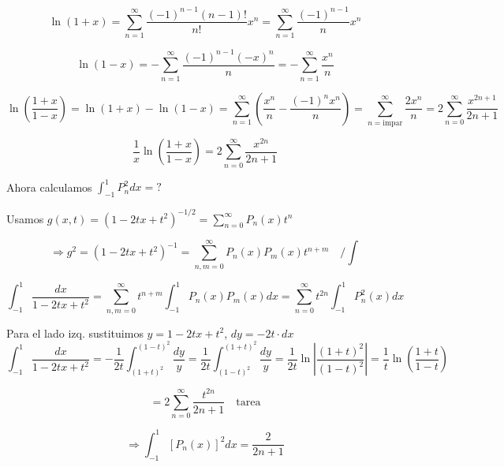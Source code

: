 \begin{equation}
    \ln(1+x) = \sum_{n=1}^{\infty} \frac{(-1)^{n-1}(n-1)!}{n!} x^n = \sum_{n=1}^{\infty} \frac{(-1)^{n-1}}{n} x^n
\end{equation}

\begin{equation}
    \ln(1-x) = -\sum_{n=1}^{\infty} \frac{(-1)^{n-1}(-x)^n}{n} = -\sum_{n=1}^{\infty} \frac{x^n}{n}
\end{equation}

\begin{equation}
    \ln(\frac{1+x}{1-x}) = \ln(1+x) - \ln(1-x) = \sum_{n=1}^{\infty} (\frac{x^n}{n} - \frac{(-1)^n x^n}{n}) = \sum_{n=\text{impar}}^{\infty} \frac{2 x^n}{n} = 2 \sum_{n=0}^{\infty} \frac{x^{2n+1}}{2n+1}
\end{equation}

\begin{equation}
    \frac{1}{x} \ln(\frac{1+x}{1-x}) = 2 \sum_{n=0}^{\infty} \frac{x^{2n}}{2n+1}
\end{equation}


Ahora calculamos $\int_{-1}^{1} P_n^2 dx = ?$

Usamos $g(x,t) = (1-2tx+t^2)^{-1/2} = \sum_{n=0}^{\infty} P_n(x) t^n$

\begin{equation}
    \Rightarrow g^2 = (1-2tx+t^2)^{-1} = \sum_{n,m=0}^{\infty} P_n(x) P_m(x) t^{n+m} \quad / \int
\end{equation}

\begin{equation}
    \int_{-1}^{1} \frac{dx}{1-2tx+t^2} = \sum_{n,m=0}^{\infty} t^{n+m} \int_{-1}^{1} P_n(x) P_m(x) dx = \sum_{n=0}^{\infty} t^{2n} \int_{-1}^{1} P_n^2(x) dx
\end{equation}

Para el lado izq. sustituimos $y = 1-2tx+t^2$, $dy = -2t \cdot dx$
\begin{equation}
    \int_{-1}^{1} \frac{dx}{1-2tx+t^2} = -\frac{1}{2t} \int_{(1+t)^2}^{(1-t)^2} \frac{dy}{y} = \frac{1}{2t} \int_{(1-t)^2}^{(1+t)^2} \frac{dy}{y} = \frac{1}{2t} \ln \left| \frac{(1+t)^2}{(1-t)^2} \right| = \frac{1}{t} \ln(\frac{1+t}{1-t})
\end{equation}

\begin{equation}
    = 2 \sum_{n=0}^{\infty} \frac{t^{2n}}{2n+1} \quad \text{tarea}
\end{equation}

\begin{equation}
    \Rightarrow \int_{-1}^{1} [P_n(x)]^2 dx = \frac{2}{2n+1}
\end{equation}



